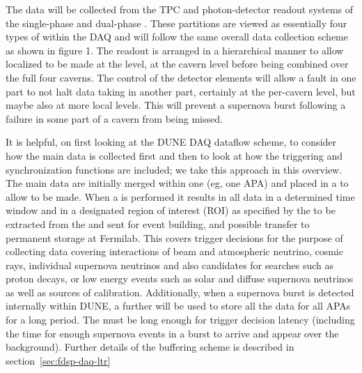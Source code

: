 The data will be collected from the TPC and photon-detector readout
systems of the single-phase and dual-phase . 
These partitions are viewed as essentially four types of
 within the DAQ and will follow the same overall
data collection scheme as shown in figure 1. 
The readout is arranged in a hierarchical manner to allow localized
 to be made at the  level, at the
cavern level before being combined over the full four caverns. 
The control of the detector elements will allow a fault in one part to
not halt data taking in another part, certainly at the per-cavern
level, but maybe also at more local levels. 
This will prevent a supernova burst following a failure in some part
of a cavern from being missed.


It is helpful, on first looking at the DUNE DAQ dataflow scheme, to
consider how the main data is collected first and then to look at how
the triggering and synchronization functions are included; we take
this approach in this overview. 
The main data are initially merged within one  (eg, one
APA) and placed in a  to allow 
to be made. 
When a  is performed it results in all data in a
determined time window and in a designated region of interest (ROI) as
specified by the  to be extracted from the
 and sent for event building,  and
possible transfer to permanent storage at Fermilab. 
This covers trigger decisions for the purpose of collecting data
covering interactions of beam and atmospheric neutrino, cosmic rays,
individual supernova neutrinos and also candidates for searches such
as proton decays, or low energy events such as solar and diffuse
supernova neutrinos as well as sources of calibration. 
Additionally, when a supernova burst is detected internally within
DUNE, a further  will be used to store all the data
for all APAs for a long period. 
The  must be long enough for trigger decision
latency (including the time for enough supernova events in a burst to
arrive and appear over the background). Further details of the
buffering scheme is described in section~\ref{sec:fdsp-daq-ltr}

